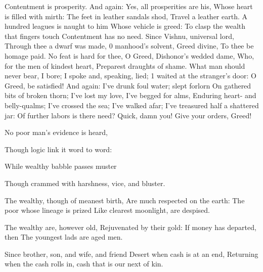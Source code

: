 \documentclass{book}
\begin{document}
Contentment is prosperity.
And again:
Yes, all prosperities are his,
Whose heart is filled with mirth:
The feet in leather sandals shod,
Travel a leather earth.
A hundred leagues is naught to him
Whose vehicle is greed:
To clasp the wealth that fingers touch
Contentment has no need.
Since Vishnu, universal lord,
Through thee a dwarf was made,
0 manhood's solvent, Greed divine,
To thee be homage paid.
No feat is hard for thee, O Greed,
Dishonor's wedded dame,
Who, for the men of kindest heart,
Preparest draughts of shame.
What man should never bear, I bore;
I spoke and, speaking, lied;
1  waited at the stranger's door:
O Greed, be satisfied!
And again:
I've drunk foul water; slept forlorn
On gathered bits of broken thorn;
I've lost my love, I've begged for alms,
Enduring heart- and belly-qualms;
I've crossed the sea; I've walked afar;
I've treasured half a shattered jar:
Of further labors is there need?
Quick, damn you! Give your orders, Greed!

No poor man's evidence is heard,

Though logic link it word to word:

While wealthy babble passes muster

Though crammed with harshness, vice, and bluster.

The wealthy, though of meanest birth,
Are much respected on the earth:
The poor whose lineage is prized
Like clearest moonlight, are despised.

The wealthy are, however old,
Rejuvenated by their gold:
If money has departed, then
The youngest lads are aged men.

Since brother, son, and wife, and friend
Desert when cash is at an end,
Returning when the cash rolls in,
cash that is our next of kin.
\end{document}
